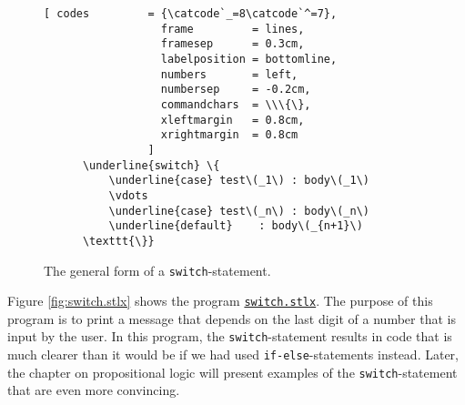 \begin{figure}[!ht]
  \centering
\begin{Verbatim}[ codes         = {\catcode`_=8\catcode`^=7},
                  frame         = lines, 
                  framesep      = 0.3cm, 
                  labelposition = bottomline,
                  numbers       = left,
                  numbersep     = -0.2cm,
                  commandchars  = \\\{\},
                  xleftmargin   = 0.8cm,
                  xrightmargin  = 0.8cm
                ]
      \underline{switch} \{
          \underline{case} test\(_1\) : body\(_1\) 
          \vdots
          \underline{case} test\(_n\) : body\(_n\)
          \underline{default}    : body\(_{n+1}\)
      \texttt{\}}
\end{Verbatim}
\vspace*{-0.3cm}
\caption{The general form of a \texttt{switch}-statement.}  \label{fig:case}
\end{figure} 

Figure \ref{fig:switch.stlx} shows the program 
\href{https://github.com/karlstroetmann/Logik/blob/master/SetlX/switch.stlx}{\texttt{switch.stlx}}.
The purpose of this program is to print a message that depends on the last digit of a number that is input by
the user.  In this program, the \texttt{switch}-statement  results in code that is much clearer than
it would be if we had
used \texttt{if-else}-statements instead.  Later, the chapter on propositional logic will present examples of the
\texttt{switch}-statement that are even more convincing.


